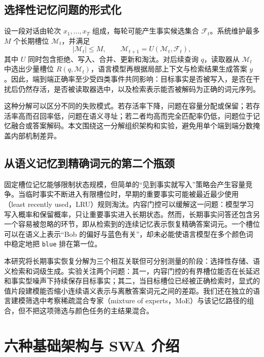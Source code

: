 \documentclass[letterpaper]{article}
\begin{document}
\subsection{选择性记忆问题的形式化}

设一段对话由轮次 $x_1,\ldots,x_T$ 组成，每轮可能产生事实候选集合 $\mathcal{F}_t$。系统维护最多 $M$ 个长期槽位 $\mathcal{M}_t$，并满足
\begin{equation}
|\mathcal{M}_t|\leq M,\qquad
\mathcal{M}_{t+1}=U(\mathcal{M}_t,\mathcal{F}_t),
\end{equation}
其中 $U$ 同时包含拒绝、写入、合并、更新和淘汰。对后续查询 $q$，读取器从 $\mathcal{M}_t$ 中选出少量槽位 $R(q,\mathcal{M}_t)$，语言模型再根据局部上下文与检索结果生成答案 $y$。因此，端到端正确率至少受四类事件共同影响：目标事实是否被写入，是否在干扰后仍然存活，是否被读取器选中，以及检索表示能否被解码为正确的词元序列。

这种分解可以区分不同的失败模式。若存活率下降，问题在容量分配或保留；若存活率高而召回率低，问题在语义寻址；若二者均高而完全匹配率仍低，问题位于记忆融合或答案解码。本文围绕这一分解组织架构和实验，避免用单个端到端分数掩盖内部机制差异。

\subsection{从语义记忆到精确词元的第二个瓶颈}

固定槽位记忆能够限制状态规模，但简单的“见到事实就写入”策略会产生容量竞争。当临时事实不断进入有限槽位时，早期的重要事实可能被最近最少使用（least recently used，LRU）规则淘汰。内容门控可以缓解这一问题：模型学习写入概率和保留概率，只让重要事实进入长期状态。然而，长期事实问答还包含另一个容易被忽略的环节，即从检索到的连续记忆表示恢复精确答案词元。一个槽位可以在语义上表示“Bob 的偏好与蓝色有关”，却未必能使语言模型在多个颜色词中稳定地把 \texttt{blue} 排在第一位。

本研究将长期事实恢复分解为三个相互关联但可分别测量的阶段：选择性存储、语义检索和词级生成。实验关注两个问题：其一，内容门控的有界槽位能否在长延迟和事实型噪声下持续保存目标事实；其二，当目标槽位已经被正确检索时，显式的值片段建模能否缩小连续语义表示与离散答案词元之间的差距。我们还在独立的语言建模筛选中考察稀疏混合专家（mixture of experts，MoE）与该记忆路径的组合，但不把这项筛选与颜色任务的主结果混合。

\section{六种基础架构与 SWA 介绍}
\end{document}
